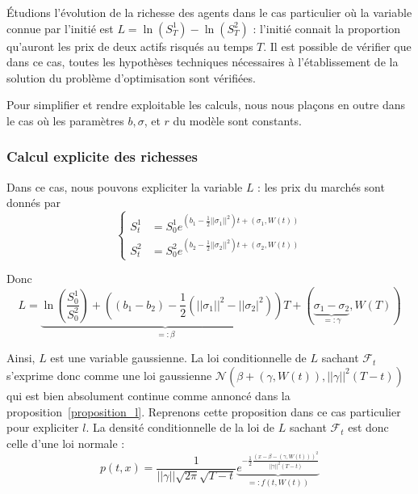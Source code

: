 \documentclass[../finalreport.tex]{subfiles}
\begin{document}
\par Étudions l'évolution de la richesse des agents dans le cas particulier où la variable connue par l'initié est $L = \ln \left( S_T^{1} \right) - \ln \left( S_T^{2} \right)$ : l'initié connait la proportion qu'auront les prix de deux actifs risqués au temps $T$. Il est possible de vérifier que dans ce cas, toutes les hypothèses techniques nécessaires à l'établissement de la solution du problème d'optimisation sont vérifiées.

\par Pour simplifier et rendre exploitable les calculs, nous nous plaçons en outre dans le cas où les paramètres $b, \sigma$, et $r$ du modèle sont constants.

\subsubsection{Calcul explicite des richesses}

\par Dans ce cas, nous pouvons expliciter la variable $L$ : les prix du marchés sont donnés par 
\begin{displaymath}
\begin{cases}
S_t^1 &= S_0^1 e^{ \left( b_1 - \frac{1}{2} ||\sigma_1||^2 \right) t + \left( \sigma_1, W \left( t \right) \right) }  \\
S_t^2 &= S_0^2 e^{ \left( b_2 - \frac{1}{2} ||\sigma_2||^2 \right) t + \left( \sigma_2, W \left( t \right) \right) }
\end{cases}
\end{displaymath}

\par Donc
\begin{displaymath}
L = \underbrace{\ln \left( \frac{S_0^1}{S_0^2} \right) + \left( \left( b_1 - b_2 \right) - \frac{1}{2} \left(||\sigma_1||^2 - ||\sigma_2|^2 \right) \right) T}_{=: \beta} + \left( \underbrace{\sigma_1 - \sigma_2}_{=: \gamma}, W \left( T \right) \right)
\end{displaymath}

\par Ainsi, $L$ est une variable gaussienne. La loi conditionnelle de $L$ sachant $\mathcal{F}_t$ s'exprime donc comme une loi gaussienne $\mathcal{N} \left( \beta + \left( \gamma, W \left( t \right) \right), ||\gamma||^2 \left( T - t \right) \right)$ qui est bien absolument continue comme annoncé dans la proposition~\ref{proposition_l}. Reprenons cette proposition dans ce cas particulier pour expliciter $l$. La densité conditionnelle de la loi de $L$ sachant $\mathcal{F}_t$ est donc celle d'une loi normale : 
\begin{displaymath}
p \left( t, x \right) = \frac{1}{ ||\gamma|| \sqrt{2 \pi} \sqrt{T - t}} \underbrace{e^{-\frac{1}{2} \frac{\left( x - \beta - \left( \gamma, W \left( t \right) \right) \right)^2}{||\gamma||^2 \left( T - t \right)}}}_{ =: f \left( t, W \left( t \right) \right)}
\end{displaymath}
\end{document}
